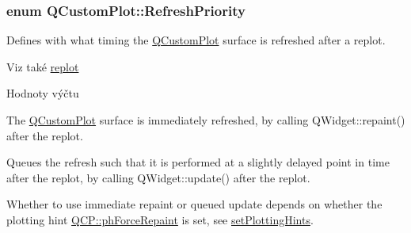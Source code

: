 \subsubsection[{Refresh\+Priority}]{\setlength{\rightskip}{0pt plus 5cm}enum {\bf Q\+Custom\+Plot\+::\+Refresh\+Priority}}\label{classQCustomPlot_a45d61392d13042e712a956d27762aa39}


Defines with what timing the \hyperlink{classQCustomPlot}{Q\+Custom\+Plot} surface is refreshed after a replot. 

\begin{DoxySeeAlso}{Viz také}
\hyperlink{classQCustomPlot_a606fd384b2a637ce2c24899bcbde77d6}{replot} 
\end{DoxySeeAlso}
\begin{Desc}
\item[Hodnoty výčtu]\par
\begin{description}
\item[{\em 
\hypertarget{classQCustomPlot_a45d61392d13042e712a956d27762aa39a0d4831572370d871f2b7cb88806bac59}{}rp\+Immediate\label{classQCustomPlot_a45d61392d13042e712a956d27762aa39a0d4831572370d871f2b7cb88806bac59}
}]The \hyperlink{classQCustomPlot}{Q\+Custom\+Plot} surface is immediately refreshed, by calling Q\+Widget\+::repaint() after the replot. \item[{\em 
\hypertarget{classQCustomPlot_a45d61392d13042e712a956d27762aa39aaaae083a19bc668597bf0f86e000f798}{}rp\+Queued\label{classQCustomPlot_a45d61392d13042e712a956d27762aa39aaaae083a19bc668597bf0f86e000f798}
}]Queues the refresh such that it is performed at a slightly delayed point in time after the replot, by calling Q\+Widget\+::update() after the replot. \item[{\em 
\hypertarget{classQCustomPlot_a45d61392d13042e712a956d27762aa39adfa1f2387617168d9299f4c8ad15b332}{}rp\+Hint\label{classQCustomPlot_a45d61392d13042e712a956d27762aa39adfa1f2387617168d9299f4c8ad15b332}
}]Whether to use immediate repaint or queued update depends on whether the plotting hint \hyperlink{namespaceQCP_a5400e5fcb9528d92002ddb938c1f4ef4aa3090dafa0e0f9a28c579c79d6c2d283}{Q\+C\+P\+::ph\+Force\+Repaint} is set, see \hyperlink{classQCustomPlot_a94a33cbdadbbac5934843508bcfc210d}{set\+Plotting\+Hints}. \end{description}
\end{Desc}



